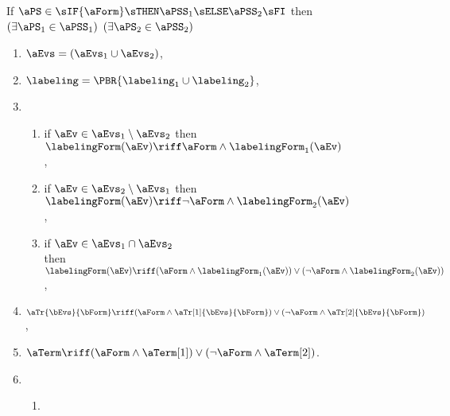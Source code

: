 \begin{figure}
  \noindent
  If $\aPS \in \sIF{\aForm}\sTHEN\aPSS_1\sELSE\aPSS_2\sFI$ then
  $(\exists\aPS_1\in\aPSS_1)$ $(\exists\aPS_2\in\aPSS_2)$
  \begin{multicols}{2}
    \begin{enumerate}[topsep=0pt,label=(\textsc{i}\arabic*),ref=\textsc{i}\arabic*]
    \item \label{if-E}
      $\aEvs = (\aEvs_1\cup\aEvs_2)$,
    \item \label{if-lambda}
      ${\labeling}=\PBR{{\labeling_1}\cup {\labeling_2}}$, 
    \item[] 
      \begin{enumerate}[leftmargin=0pt]
      \item \label{if-kappa1}
        if $\aEv\in\aEvs_1\setminus\aEvs_2$ then $\labelingForm(\aEv) \riff \aForm\land\labelingForm_1(\aEv)$,
      \item \label{if-kappa2}
        if $\aEv\in\aEvs_2\setminus\aEvs_1$ then $\labelingForm(\aEv) \riff \neg\aForm\land\labelingForm_2(\aEv)$, 
      \item \label{if-kappa12}
        if $\aEv\in\aEvs_1\cap\aEvs_2$\\ then
        $\labelingForm(\aEv) \riff (\aForm\land\labelingForm_1(\aEv))\lor(\neg\aForm\land\labelingForm_2(\aEv))$,
      \end{enumerate}
    \item \label{if-tau}
      $\aTr{\bEvs}{\bForm} \riff (\aForm\land\aTr[1]{\bEvs}{\bForm})\lor(\neg\aForm\land\aTr[2]{\bEvs}{\bForm})$,
    \item \label{if-term}
      $\aTerm \riff (\aForm\land\aTerm[1])\lor(\neg\aForm\land\aTerm[2])$.
    \item[] 
      \begin{enumerate}[leftmargin=0pt]
      \item \label{if-le-extends}

\end{enumerate}
\end{enumerate}
\end{multicols}
\end{figure}
